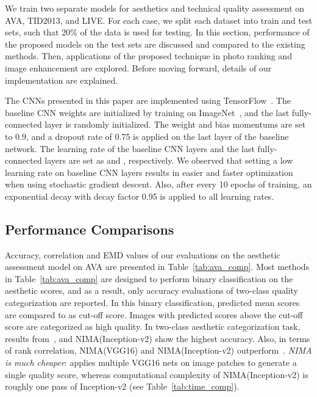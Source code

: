 \documentclass[10pt,twocolumn,twoside]{IEEEtran}
\begin{document}
We train two separate models for aesthetics and technical quality assessment on AVA, TID2013, and LIVE. For each case, we split each dataset into train and test sets, such that 20\% of the data is used for testing. In this section, performance of the proposed models on the test sets are discussed and compared to the existing methods. Then, applications of the proposed technique in photo ranking and image enhancement are explored. Before moving forward, details of our implementation are explained.

The CNNs presented in this paper are implemented using TensorFlow~\cite{abadi2016tensorflow, abadi2016tensorflow2}. The baseline CNN weights are initialized by training on ImageNet~\cite{krizhevsky2012imagenet}, and the last fully-connected layer is randomly initialized. The weight and bias momentums are set to 0.9, and a dropout rate of 0.75 is applied on the last layer of the baseline network. The learning rate of the baseline CNN layers and the last fully-connected layers are set as  and , respectively. We observed that setting a low learning rate on baseline CNN layers results in easier and faster optimization when using stochastic gradient descent. Also, after every 10 epochs of training, an exponential decay with decay factor 0.95 is applied to all learning rates.

\subsection{Performance Comparisons}
\label{sec:performance}
\vspace{0 mm}

Accuracy, correlation and EMD values of our evaluations on the aesthetic assessment model on AVA are presented in Table~\ref{tab:ava_comp}. Most methods in Table~\ref{tab:ava_comp} are designed to perform binary classification on the aesthetic scores, and as a result, only accuracy evaluations of two-class quality categorization are reported. In this binary classification, predicted mean scores are compared to  as cut-off score. Images with predicted scores above the cut-off score are categorized as high quality. In two-class aesthetic categorization task, results from~\cite{ma2017lamp}, and NIMA(Inception-v2) show the highest accuracy. Also, in terms of rank correlation, NIMA(VGG16) and NIMA(Inception-v2) outperform~\cite{kong2016photo}. \emph{NIMA is much cheaper}: \cite{ma2017lamp} applies multiple VGG16 nets on image patches to generate a single quality score, whereas computational complexity of NIMA(Inception-v2) is roughly one pass of Inception-v2 (see Table~\ref{tab:time_comp}).
\end{document}
